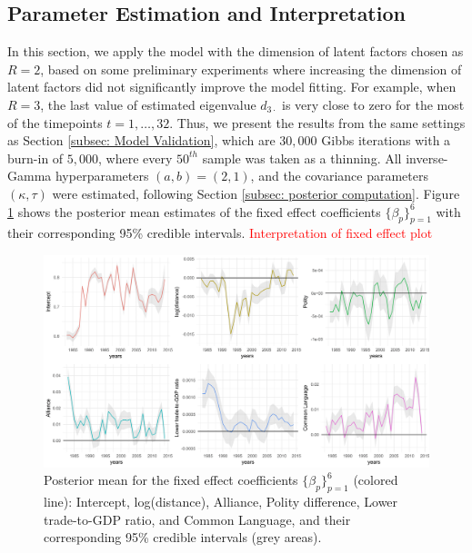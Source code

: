 \documentclass[a4paper]{article}
\begin{document}
\subsection{Parameter Estimation and Interpretation}\label{subsec: UNresult}
In this section, we apply the model with the dimension of latent factors chosen as $R=2$, based on some preliminary experiments where increasing the dimension of latent factors did not significantly improve the model fitting. For example, when $R=3$, the last value of estimated eigenvalue $d_{3\cdot}$ is very close to zero for the most of the timepoints $t=1,\ldots,32$. Thus, we present the results from the same settings as Section \ref{subsec: Model Validation}, which are $30,000$ Gibbs iterations with a burn-in of $5,000$, where every $50^{th}$ sample was taken as a thinning. All inverse-Gamma hyperparameters $(a, b) = (2, 1)$, and the covariance parameters $(\kappa, \tau)$ were estimated, following Section \ref{subsec: posterior computation}. Figure \ref{figure:interceptplot} shows the posterior mean estimates of the fixed effect coefficients $\{\beta_p\}_{p=1}^6$ with their corresponding 95\% credible intervals. \textcolor{red}{Interpretation of fixed effect plot} \\
\begin{figure}[ht]
	\begin{center}
		\includegraphics[width=1\textwidth]{plots_paper/betaplot-1.png}
	\end{center}
	 	\caption {Posterior mean for the fixed effect coefficients $\{\beta_p\}_{p=1}^6$  (colored line): Intercept, log(distance), Alliance, Polity difference, Lower trade-to-GDP ratio, and Common Language, and their corresponding 95\% credible intervals (grey areas). }
	\label{figure:interceptplot}
\end{figure}
\end{document}
